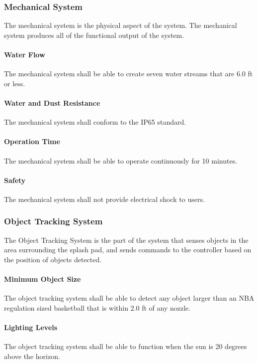 \subsubsection{Mechanical System}
The mechanical system is the physical aspect of the system. The mechanical system produces all of the functional output of the system. 

\paragraph{Water Flow}
The mechanical system shall be able to create seven water streams that are 6.0 ft or less. 

\paragraph{Water and Dust Resistance}
The mechanical system shall conform to the IP65 standard.   

\paragraph{Operation Time}
The mechanical system shall be able to operate continuously for 10 minutes. 

\paragraph{Safety}
The mechanical system shall not provide electrical shock to users. 

\subsubsection{Object Tracking System}
The Object Tracking System is the part of the system that senses objects in the area surrounding the splash pad, and sends commands to the controller based on the position of objects detected.

\paragraph{Minimum Object Size}
The object tracking system shall be able to detect any object larger than an NBA regulation sized basketball that is within 2.0 ft of any nozzle.

\paragraph{Lighting Levels}
The object tracking system shall be able to function when the sun is 20 degrees above the horizon.%

